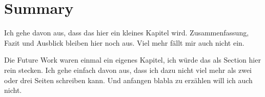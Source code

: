 \chapter{Summary}

Ich gehe davon aus, dass das hier ein kleines Kapitel wird. Zusammenfassung, Fazit und Ausblick bleiben hier noch aus. Viel mehr fällt mir auch nicht ein.


Die Future Work waren einmal ein eigenes Kapitel, ich würde das als Section hier rein stecken. Ich gehe einfach davon aus, dass ich dazu nicht viel mehr als zwei oder drei Seiten schreiben kann. Und anfangen blabla zu erzählen will ich auch nicht.